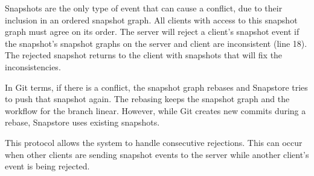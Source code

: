 Snapshots are the only type of event that can cause a conflict, due to their inclusion in an ordered snapshot graph. All clients with access to this snapshot graph must agree on its order. The server will reject a client's snapshot event if the snapshot's snapshot graphs on the server and client are inconsistent (line 18). The rejected snapshot returns to the client with snapshots that will fix the inconsistencies.

In Git terms, if there is a conflict, the snapshot graph rebases and Snapstore tries to push that snapshot again. The rebasing keeps the snapshot graph and the workflow for the branch linear. However, while Git creates new commits during a rebase, Snapstore uses existing snapshots.

This protocol allows the system to handle consecutive rejections. This can occur when other clients are sending snapshot events to the server while another client's event is being rejected.


